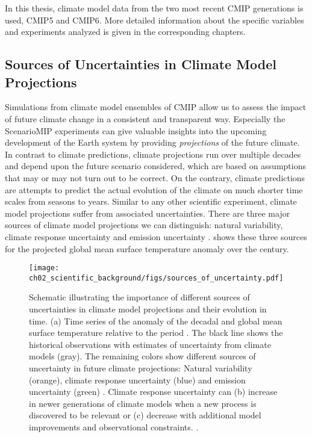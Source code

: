 In this thesis, climate model data from the two most recent \ac{CMIP}
generations is used, \acs{CMIP}5 and \acs{CMIP}6. More detailed information
about the specific variables and experiments analyzed is given in the
corresponding chapters.


\subsection{Sources of Uncertainties in Climate Model Projections}
\label{subsec:02:source_of_uncertainties}

Simulations from climate model ensembles of \ac{CMIP} allow us to assess the
impact of future climate change in a consistent and transparent way. Especially
the \ac{ScenarioMIP} experiments can give valuable insights into the upcoming
development of the Earth system by providing \emph{projections} of the future
climate. In contrast to climate predictions, climate projections run over
multiple decades and depend upon the future scenario considered, which are
based on assumptions that may or may not turn out to be correct. On the
contrary, climate predictions are attempts to predict the actual evolution of
the climate on much shorter time scales from seasons to years. Similar to any
other scientific experiment, climate model projections suffer from associated
uncertainties. There are three major sources of climate model projections we
can distinguish: natural variability, climate response uncertainty and emission
uncertainty \autocite{Hawkins2009, Hawkins2010}.
 shows these three sources for the
projected global mean surface temperature anomaly over the  century.

\begin{figure}[t]
  \centering
  \texttt{[image: 
    ch02\_scientific\_background/figs/sources\_of\_uncertainty.pdf]}
  \caption{Schematic illustrating the importance of different sources of
    uncertainties in climate model projections and their evolution in time. (a)
    Time series of the anomaly of the decadal and global mean surface
    temperature relative to the period . The black line
    shows the historical observations with estimates of uncertainty from
    climate models (gray). The remaining colors show different sources of
    uncertainty in future climate projections: Natural variability (orange),
    climate response uncertainty (blue) and emission uncertainty (green)
    \autocite{Hawkins2009, Hawkins2010}. Climate response uncertainty can (b)
    increase in newer generations of climate models when a new process is
    discovered to be relevant or (c) decrease with additional model
    improvements and observational constraints.
    .}
  \label{fig:02:sources_of_uncertainty}
\end{figure}


